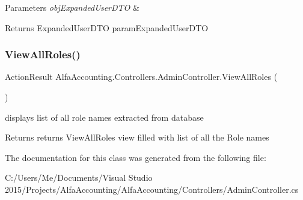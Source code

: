 \begin{DoxyParams}{Parameters}
{\em obj\+Expanded\+User\+D\+TO} & \\
\hline
\end{DoxyParams}
\begin{DoxyReturn}{Returns}
Expanded\+User\+D\+TO param\+Expanded\+User\+D\+TO
\end{DoxyReturn}
\mbox{\label{class_alfa_accounting_1_1_controllers_1_1_admin_controller_ab80cc7f0ef15de30d04a72e93cb16a98}} 
\subsubsection{\texorpdfstring{View\+All\+Roles()}{ViewAllRoles()}}
{\footnotesize\ttfamily Action\+Result Alfa\+Accounting.\+Controllers.\+Admin\+Controller.\+View\+All\+Roles (\begin{DoxyParamCaption}{ }\end{DoxyParamCaption})}



displays list of all role names extracted from database 

\begin{DoxyReturn}{Returns}
returns View\+All\+Roles view filled with list of all the Role names
\end{DoxyReturn}


The documentation for this class was generated from the following file\+:\begin{DoxyCompactItemize}
\item 
C\+:/\+Users/\+Me/\+Documents/\+Visual Studio 2015/\+Projects/\+Alfa\+Accounting/\+Alfa\+Accounting/\+Controllers/Admin\+Controller.\+cs\end{DoxyCompactItemize}
